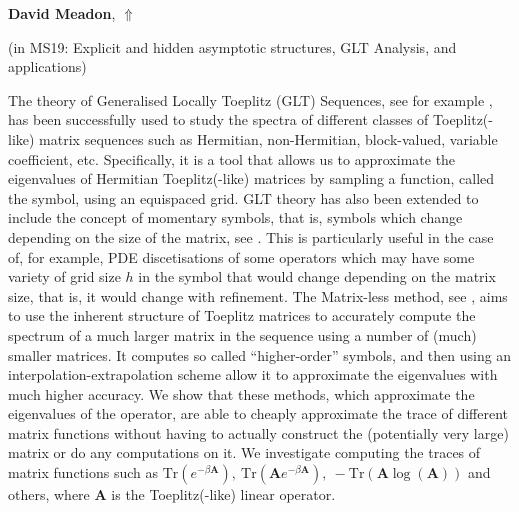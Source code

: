 \documentclass[ILAS2025-program.tex]{subfiles}
\begin{document}
\hypertarget{down0220}{}\begin{ilasabstract}
    
\textbf{David Meadon},  \hfill \hyperlink{up0220}{$\Uparrow$}
    
    
(in {\color{mstitle}MS19: Explicit and hidden asymptotic structures, GLT Analysis, and applications})
        
\mtskip
    \begin{bibunit}
        The theory of Generalised Locally Toeplitz (GLT) Sequences, see for example \cite{garoni171}, has been successfully used to study the spectra of different classes of Toeplitz(-like) matrix sequences such as Hermitian, non-Hermitian, block-valued, variable coefficient, etc. Specifically, it is a tool that allows us to approximate the eigenvalues of Hermitian Toeplitz(-like) matrices by sampling a function, called the symbol, using an equispaced grid. GLT theory has also been extended to include the concept of momentary symbols, that is, symbols which change depending on the size of the matrix, see \cite{Bolten2022}. This is particularly useful in the case of, for example, PDE discetisations of some  operators which may have some variety of grid size \(h\) in the symbol that would change depending on the matrix size, that is, it would change with refinement.
The Matrix-less method, see \cite{ekstrom2018matrix,expmathmlm,ekstromreal, variablecoef}, aims to use the inherent structure of Toeplitz matrices to accurately compute the spectrum of a much larger matrix in the sequence using a number of (much) smaller matrices. It computes so called ``higher-order'' symbols, and then using an interpolation-extrapolation scheme allow it to approximate the eigenvalues with much higher accuracy.
We show that these methods, which approximate the eigenvalues of the operator, are able to cheaply approximate the trace of different matrix functions without having to actually construct the (potentially very large) matrix or do any computations on it. We investigate computing the traces of matrix functions such as \(\mathrm{Tr}\left(e^{-\beta \mathbf{A}}\right),~\mathrm{Tr}\left(\mathbf{A}e^{-\beta \mathbf{A}}\right),~-\mathrm{Tr}\left(\mathbf{A}\log\left(\mathbf{A}\right)\right)\) and others, where \(\mathbf{A}\) is the Toeplitz(-like) linear operator.


\end{bibunit}
\end{ilasabstract}
\end{document}
